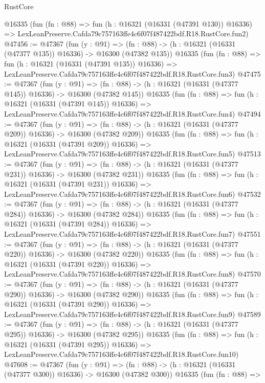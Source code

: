 \begin{lexlean}{RustCore}
\begin{coremodule}
    @16335
    (fun (fn : @88) =>
    fun (h : @16321 (@16331 (@47391 @130)) @16336) =>
    LexLeanPreserve.Cafda79c757163ffe4c6f07f487422bdf.R18.RustCore.fun2)
@47456 := @47367
    (fun (y : @91) =>
    (fn : @88) -> (h : @16321 (@16331 (@47377 @135)) @16336) -> @16300 (@47382 @135))
    @16335
    (fun (fn : @88) =>
    fun (h : @16321 (@16331 (@47391 @135)) @16336) =>
    LexLeanPreserve.Cafda79c757163ffe4c6f07f487422bdf.R18.RustCore.fun3)
@47475 := @47367
    (fun (y : @91) =>
    (fn : @88) -> (h : @16321 (@16331 (@47377 @145)) @16336) -> @16300 (@47382 @145))
    @16335
    (fun (fn : @88) =>
    fun (h : @16321 (@16331 (@47391 @145)) @16336) =>
    LexLeanPreserve.Cafda79c757163ffe4c6f07f487422bdf.R18.RustCore.fun4)
@47494 := @47367
    (fun (y : @91) =>
    (fn : @88) -> (h : @16321 (@16331 (@47377 @209)) @16336) -> @16300 (@47382 @209))
    @16335
    (fun (fn : @88) =>
    fun (h : @16321 (@16331 (@47391 @209)) @16336) =>
    LexLeanPreserve.Cafda79c757163ffe4c6f07f487422bdf.R18.RustCore.fun5)
@47513 := @47367
    (fun (y : @91) =>
    (fn : @88) -> (h : @16321 (@16331 (@47377 @231)) @16336) -> @16300 (@47382 @231))
    @16335
    (fun (fn : @88) =>
    fun (h : @16321 (@16331 (@47391 @231)) @16336) =>
    LexLeanPreserve.Cafda79c757163ffe4c6f07f487422bdf.R18.RustCore.fun6)
@47532 := @47367
    (fun (y : @91) =>
    (fn : @88) -> (h : @16321 (@16331 (@47377 @284)) @16336) -> @16300 (@47382 @284))
    @16335
    (fun (fn : @88) =>
    fun (h : @16321 (@16331 (@47391 @284)) @16336) =>
    LexLeanPreserve.Cafda79c757163ffe4c6f07f487422bdf.R18.RustCore.fun7)
@47551 := @47367
    (fun (y : @91) =>
    (fn : @88) -> (h : @16321 (@16331 (@47377 @220)) @16336) -> @16300 (@47382 @220))
    @16335
    (fun (fn : @88) =>
    fun (h : @16321 (@16331 (@47391 @220)) @16336) =>
    LexLeanPreserve.Cafda79c757163ffe4c6f07f487422bdf.R18.RustCore.fun8)
@47570 := @47367
    (fun (y : @91) =>
    (fn : @88) -> (h : @16321 (@16331 (@47377 @290)) @16336) -> @16300 (@47382 @290))
    @16335
    (fun (fn : @88) =>
    fun (h : @16321 (@16331 (@47391 @290)) @16336) =>
    LexLeanPreserve.Cafda79c757163ffe4c6f07f487422bdf.R18.RustCore.fun9)
@47589 := @47367
    (fun (y : @91) =>
    (fn : @88) -> (h : @16321 (@16331 (@47377 @295)) @16336) -> @16300 (@47382 @295))
    @16335
    (fun (fn : @88) =>
    fun (h : @16321 (@16331 (@47391 @295)) @16336) =>
    LexLeanPreserve.Cafda79c757163ffe4c6f07f487422bdf.R18.RustCore.fun10)
@47608 := @47367
    (fun (y : @91) =>
    (fn : @88) -> (h : @16321 (@16331 (@47377 @300)) @16336) -> @16300 (@47382 @300))
    @16335
    (fun (fn : @88) =>

\end{coremodule}
\end{lexlean}
